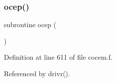 \mbox{\label{cocem_8f_a007bf5973b6afe4ae1f1523d2af38927}} 
\subsubsection{\texorpdfstring{ocep()}{ocep()}}
{\footnotesize\ttfamily subroutine ocep (\begin{DoxyParamCaption}{ }\end{DoxyParamCaption})}



Definition at line 611 of file cocem.\+f.



Referenced by drivr().

